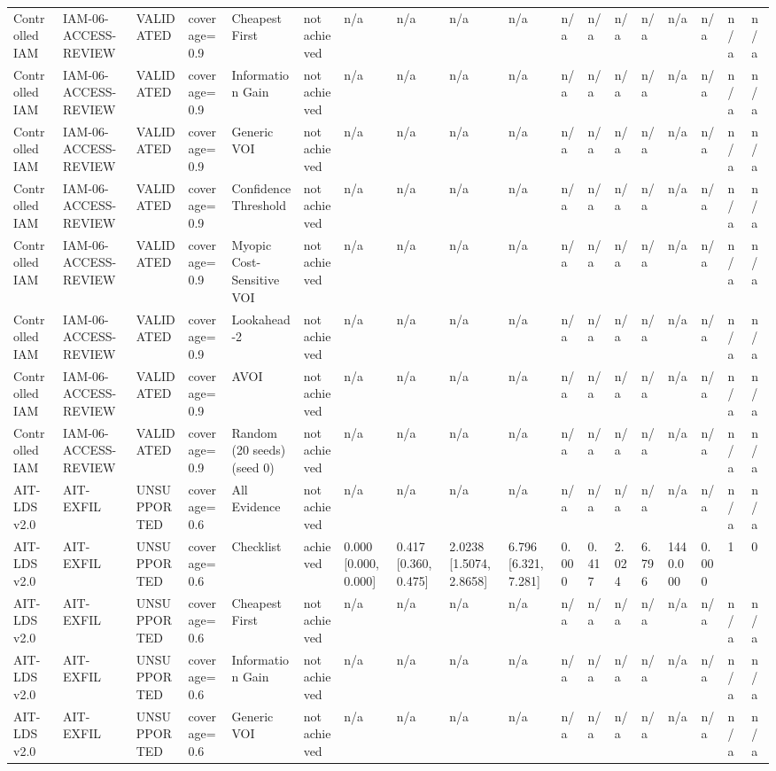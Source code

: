 \begin{table}[!ht]
{\begin{tabular}{llllllllllllllllll}
Controlled IAM & IAM-06-ACCESS-REVIEW & VALIDATED & coverage=0.9 & Cheapest First & not achieved & n/a & n/a & n/a & n/a & n/a & n/a & n/a & n/a & n/a & n/a & n/a & n/a \\
Controlled IAM & IAM-06-ACCESS-REVIEW & VALIDATED & coverage=0.9 & Information Gain & not achieved & n/a & n/a & n/a & n/a & n/a & n/a & n/a & n/a & n/a & n/a & n/a & n/a \\
Controlled IAM & IAM-06-ACCESS-REVIEW & VALIDATED & coverage=0.9 & Generic VOI & not achieved & n/a & n/a & n/a & n/a & n/a & n/a & n/a & n/a & n/a & n/a & n/a & n/a \\
Controlled IAM & IAM-06-ACCESS-REVIEW & VALIDATED & coverage=0.9 & Confidence Threshold & not achieved & n/a & n/a & n/a & n/a & n/a & n/a & n/a & n/a & n/a & n/a & n/a & n/a \\
Controlled IAM & IAM-06-ACCESS-REVIEW & VALIDATED & coverage=0.9 & Myopic Cost-Sensitive VOI & not achieved & n/a & n/a & n/a & n/a & n/a & n/a & n/a & n/a & n/a & n/a & n/a & n/a \\
Controlled IAM & IAM-06-ACCESS-REVIEW & VALIDATED & coverage=0.9 & Lookahead-2 & not achieved & n/a & n/a & n/a & n/a & n/a & n/a & n/a & n/a & n/a & n/a & n/a & n/a \\
Controlled IAM & IAM-06-ACCESS-REVIEW & VALIDATED & coverage=0.9 & AVOI & not achieved & n/a & n/a & n/a & n/a & n/a & n/a & n/a & n/a & n/a & n/a & n/a & n/a \\
Controlled IAM & IAM-06-ACCESS-REVIEW & VALIDATED & coverage=0.9 & Random (20 seeds) (seed 0) & not achieved & n/a & n/a & n/a & n/a & n/a & n/a & n/a & n/a & n/a & n/a & n/a & n/a \\
AIT-LDS v2.0 & AIT-EXFIL & UNSUPPORTED & coverage=0.6 & All Evidence & not achieved & n/a & n/a & n/a & n/a & n/a & n/a & n/a & n/a & n/a & n/a & n/a & n/a \\
AIT-LDS v2.0 & AIT-EXFIL & UNSUPPORTED & coverage=0.6 & Checklist & achieved & 0.000 [0.000, 0.000] & 0.417 [0.360, 0.475] & 2.0238 [1.5074, 2.8658] & 6.796 [6.321, 7.281] & 0.000 & 0.417 & 2.024 & 6.796 & 1440.000 & 0.000 & 1 & 0 \\
AIT-LDS v2.0 & AIT-EXFIL & UNSUPPORTED & coverage=0.6 & Cheapest First & not achieved & n/a & n/a & n/a & n/a & n/a & n/a & n/a & n/a & n/a & n/a & n/a & n/a \\
AIT-LDS v2.0 & AIT-EXFIL & UNSUPPORTED & coverage=0.6 & Information Gain & not achieved & n/a & n/a & n/a & n/a & n/a & n/a & n/a & n/a & n/a & n/a & n/a & n/a \\
AIT-LDS v2.0 & AIT-EXFIL & UNSUPPORTED & coverage=0.6 & Generic VOI & not achieved & n/a & n/a & n/a & n/a & n/a & n/a & n/a & n/a & n/a & n/a & n/a & n/a \\

\end{tabular}}
\end{table}
